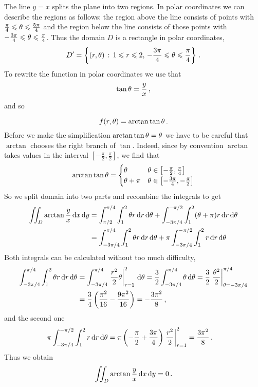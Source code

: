 \begin{solution}
\begin{enumerate}
\begin{adjustbox}{valign=T,raise=\strutheight,minipage={\linewidth}}
\begin{wrapfigure}{r}{0.35\textwidth}
\end{wrapfigure}
\strut{}
The line $y=x$ splits the plane into two regions. 
In polar coordinates we can describe the regions as follows: the region above the line consists of points with $\frac \pi 4 \leqslant \theta \leqslant \frac {5\pi}4$ and the region below the line consists of those points with $-\frac{3\pi}{4} \leqslant \theta \leqslant \frac \pi 4$. Thus the domain $D$ is a rectangle in polar coordinates,
\[
D' = \left\{ (r,\theta) \,:\, 1 \leqslant r \leqslant 2,\, -\frac{3\pi}4 \leqslant \theta \leqslant \frac \pi 4 \right\}\,.
\]
To rewrite the function in polar coordinates we use that
\[
\tan \theta = \frac y x\,,
\]
and so 
\end{adjustbox}
\[
f(r,\theta) = \arctan \tan \theta\,.
\]
Before we make the simplification $\arctan \tan \theta = \theta$ we have to be careful that $\arctan$ chooses the right branch of $\tan$. Indeed, since by convention $\arctan$ takes values in the interval $\left[-\frac \pi 2, \frac \pi 2\right]$, we find that
\[
\arctan \tan \theta = \begin{cases}
\theta & \theta \in \left[-\frac \pi 2, \frac \pi 4\right] \\
\theta + \pi & \theta \in \left[-\frac {3\pi} 4, -\frac \pi 2\right]
\end{cases}
\]
So we split domain into two parts and recombine the integrals to get
\begin{align*}
\iint_D \arctan \frac y x \,\mathrm{d} x \,\mathrm{d} y &= \int_{\pi/2}^{\pi/4} \int_1^2\theta r \,\mathrm{d} r \,\mathrm{d} \theta
+ \int_{-3\pi/4}^{-\pi/2} \int_1^2(\theta+\pi)r \,\mathrm{d} r \,\mathrm{d} \theta \\
&=\int_{-3\pi/4}^{\pi/4} \int_1^2\theta r \,\mathrm{d} r \,\mathrm{d} \theta
+ \pi \int_{-3\pi/4}^{-\pi/2} \int_1^2 r \,\mathrm{d} r \,\mathrm{d} \theta
\end{align*}
Both integrals can be calculated without too much difficulty,
\begin{align*}
\int_{-3\pi/4}^{\pi/4} \int_1^2\theta r \,\mathrm{d} r \,\mathrm{d} \theta
&= \int_{-3\pi/4}^{\pi/4} \left. \frac {r^2}2 \theta \right|_{r=1}^2 \,\mathrm{d} \theta
= \frac 32 \int_{-3\pi/4}^{\pi/4} \theta \,\mathrm{d} \theta
= \frac 32 \left. \frac {\theta^2} 2 \right|_{\theta = -3\pi/4}^{\pi/4} \\
&= \frac 34 \left( \frac {\pi^2}{16} - \frac{9\pi^2}{16} \right)
= -\frac {3\pi^2}8\,,
\end{align*}
and the second one
\begin{align*}
\pi \int_{-3\pi/4}^{-\pi/2} \int_1^2 r \,\mathrm{d} r \,\mathrm{d} \theta &= \pi \left( -\frac \pi 2 + \frac{3\pi}4 \right)
\left. \frac{r^2}2 \right|_{r=1}^2 = \frac{3\pi^2}8\,.
\end{align*}
Thus we obtain
\[
\iint_D \arctan \frac y x \,\mathrm{d} x \,\mathrm{d} y = 0\,.
\]


\end{enumerate}
\end{solution}
